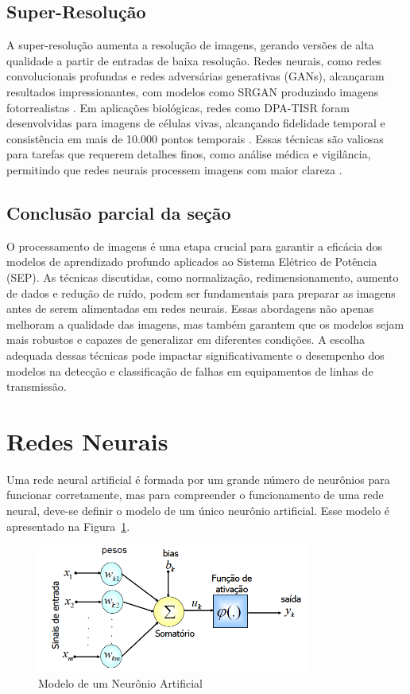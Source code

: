 \subsection{Super-Resolução}
A super-resolução aumenta a resolução de imagens, gerando versões de alta qualidade a partir de entradas de baixa resolução. Redes neurais, como redes convolucionais profundas e redes adversárias generativas (GANs), alcançaram resultados impressionantes, com modelos como SRGAN produzindo imagens fotorrealistas \cite{ledig2017photo}. Em aplicações biológicas, redes como DPA-TISR foram desenvolvidas para imagens de células vivas, alcançando fidelidade temporal e consistência em mais de 10.000 pontos temporais \cite{liu2025neural}. Essas técnicas são valiosas para tarefas que requerem detalhes finos, como análise médica e vigilância, permitindo que redes neurais processem imagens com maior clareza \cite{ledig2017photo}.

\subsection{Conclusão parcial da seção}

O processamento de imagens é uma etapa crucial para garantir a eficácia dos modelos de aprendizado profundo aplicados ao Sistema Elétrico de Potência (SEP). As técnicas discutidas, como normalização, redimensionamento, aumento de dados e redução de ruído, podem ser fundamentais para preparar as imagens antes de serem alimentadas em redes neurais. Essas abordagens não apenas melhoram a qualidade das imagens, mas também garantem que os modelos sejam mais robustos e capazes de generalizar em diferentes condições. A escolha adequada dessas técnicas pode impactar significativamente o desempenho dos modelos na detecção e classificação de falhas em equipamentos de linhas de transmissão.

\section{Redes Neurais}
Uma rede neural artificial é formada por um grande número de neurônios para funcionar corretamente, mas para compreender o funcionamento de uma rede neural, deve-se definir o modelo de um único neurônio artificial. Esse modelo é apresentado na Figura~\ref{fig:neuronio}.

\begin{figure}[H]
    \centering
    \caption{\label{fig:neuronio}Modelo de um Neurônio Artificial}
    \includegraphics[width=0.8\textwidth]{img/revisao_bibliografica/neuronio.png}
\end{figure}

